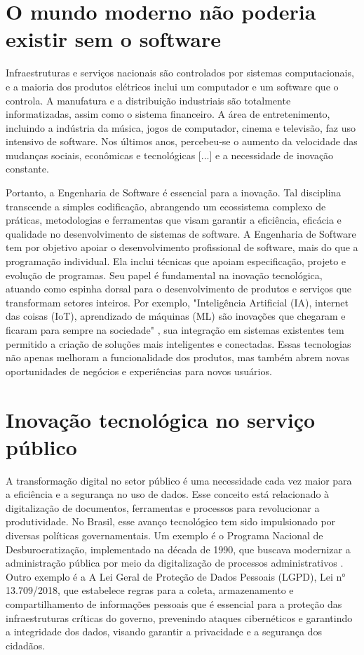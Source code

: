 \documentclass[12pt,oneside,a4paper,article]{abntex2}
\begin{document}
\section{O mundo moderno não poderia existir sem o software}
Infraestruturas e serviços nacionais são controlados por sistemas computacionais, e a maioria dos produtos elétricos inclui um computador e um software que o controla. A manufatura e a distribuição industriais são totalmente informatizadas, assim como o sistema financeiro. A área de entretenimento, incluindo a indústria da música, jogos de computador, cinema e televisão, faz uso intensivo de software. Nos últimos anos, percebeu-se o aumento da velocidade das mudanças sociais, econômicas e tecnológicas [...] e a necessidade de inovação constante.\cite{albertin2021transformaccao}

Portanto, a Engenharia de Software é essencial para a inovação. Tal disciplina transcende a simples codificação, abrangendo um ecossistema complexo de práticas, metodologias e ferramentas que visam garantir a eficiência, eficácia e qualidade no desenvolvimento de sistemas de software. A Engenharia de Software tem por objetivo apoiar o desenvolvimento profissional de software, mais do que a programação individual. Ela inclui técnicas que apoiam especificação, projeto e evolução de programas. Seu papel é fundamental na inovação tecnológica, atuando como espinha dorsal para o desenvolvimento de produtos e serviços que transformam setores inteiros. Por exemplo, "Inteligência Artificial (IA), internet das coisas (IoT), aprendizado de máquinas (ML) são inovações que chegaram e ficaram para sempre na sociedade" \cite{marques2023ciencia}, sua integração em sistemas existentes tem permitido a criação de soluções mais inteligentes e conectadas. Essas tecnologias não apenas melhoram a funcionalidade dos produtos, mas também abrem novas oportunidades de negócios e experiências para novos usuários.

\section{Inovação tecnológica no serviço público}
A transformação digital no setor público é uma necessidade cada vez maior para a eficiência e a segurança no uso de dados. Esse conceito está relacionado à digitalização de documentos, ferramentas e processos para revolucionar a produtividade. No Brasil, esse avanço tecnológico tem sido impulsionado por diversas políticas governamentais. Um exemplo é o Programa Nacional de Desburocratização, implementado na década de 1990, que buscava modernizar a administração pública por meio da digitalização de processos administrativos \cite{grin2015programa}. Outro exemplo é a A Lei Geral de Proteção de Dados Pessoais (LGPD), Lei n° 13.709/2018, que estabelece regras para a coleta, armazenamento e compartilhamento de informações pessoais que é essencial para a proteção das infraestruturas críticas do governo, prevenindo ataques cibernéticos e garantindo a integridade dos dados, visando garantir a privacidade e a segurança dos cidadãos\cite{govbr_mds_lgpd}.
 
\end{document}
